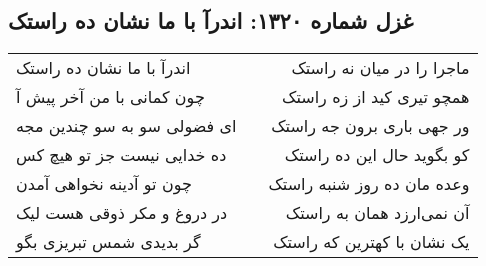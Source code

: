 \begin{center}
\section*{غزل شماره ۱۳۲۰: اندرآ با ما نشان ده راستک}
\label{sec:1320}
\begin{longtable}{l p{0.5cm} r}
اندرآ با ما نشان ده راستک
&&
ماجرا را در میان نه راستک
\\
چون کمانی با من آخر پیش آ
&&
همچو تیری کید از زه راستک
\\
ای فضولی سو به سو چندین مجه
&&
ور جهی باری برون جه راستک
\\
ده خدایی نیست جز تو هیچ کس
&&
کو بگوید حال این ده راستک
\\
چون تو آدینه نخواهی آمدن
&&
وعده مان ده روز شنبه راستک
\\
در دروغ و مکر ذوقی هست لیک
&&
آن نمی‌ارزد همان به راستک
\\
گر بدیدی شمس تبریزی بگو
&&
یک نشان با کهترین که راستک
\\
\end{longtable}
\end{center}

